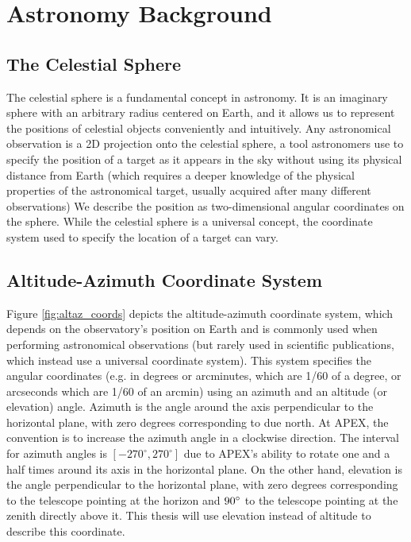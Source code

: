 \section{Astronomy Background}\label{sec:ast_terms}
\subsection{The Celestial Sphere}
The celestial sphere is a fundamental concept in astronomy.
It is an imaginary sphere with an arbitrary radius centered on Earth, and it allows us to represent the positions of celestial objects conveniently and intuitively.
Any astronomical observation is a 2D projection onto the celestial sphere,
a tool astronomers use to specify the position of a target as it appears in the sky without using its physical distance from Earth
(which requires a deeper knowledge of the physical properties of the astronomical target, usually acquired after many different observations)
We describe the position as two-dimensional angular coordinates on the sphere.
While the celestial sphere is a universal concept, the coordinate system used to specify the location of a target can vary.




\subsection{Altitude-Azimuth Coordinate System}\label{sec:altaz_coords}
Figure \ref{fig:altaz_coords} depicts the altitude-azimuth coordinate system,
which depends on the observatory's position on Earth and is commonly used when performing astronomical observations
(but rarely used in scientific publications, which instead use a universal coordinate system).
This system specifies the angular coordinates (e.g. in degrees or arcminutes, which are 1/60 of a degree, or arcseconds which are 1/60 of an arcmin)
using an azimuth and an altitude (or elevation) angle.
Azimuth is the angle around the axis perpendicular to the horizontal plane, with zero degrees corresponding to due north.
At APEX, the convention is to increase the azimuth angle in a clockwise direction.
The interval for azimuth angles is $[-270^\circ,270^\circ]$ due to APEX's ability to rotate one and a half times around its axis in the horizontal plane.
On the other hand, elevation is the angle perpendicular to the horizontal plane, with zero degrees corresponding to the telescope pointing at the horizon and $90^\circ$ to the telescope pointing at the zenith directly above it.
This thesis will use elevation instead of altitude to describe this coordinate.\\


